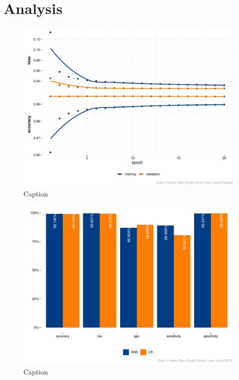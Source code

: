 \chapter{Analysis}\label{ch:5}

\begin{figure}[H]
    \centering
    \includegraphics[width = \textwidth]{Figures/p_ANN_learning.pdf}
    \caption{Caption}
    \label{fig:my_label}
\end{figure}






\begin{figure}[H]
    \centering
    \includegraphics[width = \textwidth]{Figures/p_performance.pdf}
    \caption{Caption}
    \label{fig:my_label}
\end{figure}

